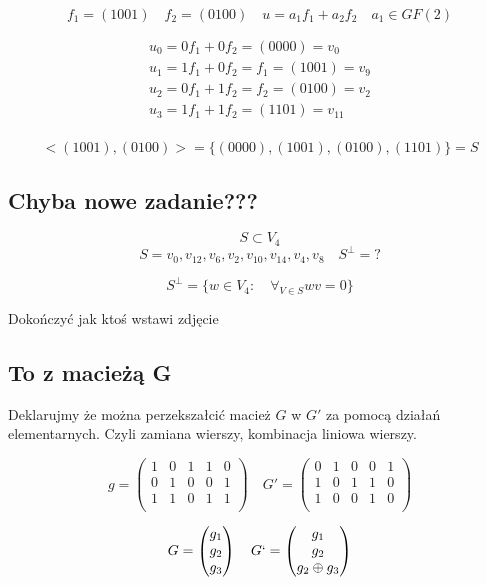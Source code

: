 \documentclass[12pt]{article}
\begin{document}
$$f_1 = (1001) \quad f_2 =(0100) \quad u = a_1f_1+a_2f_2 \quad a_1 \in GF(2) $$

\begin{align*}
    u_0 = 0f_1+0f_2 = (0000) = v_0 \\
    u_1 = 1f_1+0f_2 = f_1  = (1001) = v_9 \\
    u_2 = 0f_1+1f_2 = f_2 = (0100) = v_2 \\
    u_3 = 1f_1+1f_2 = (1101) = v_{11} \\
\end{align*}

$$<(1001),(0100)> = \{(0000), (1001),(0100),(1101)\} = S $$

\subsection*{Chyba nowe zadanie???}

$$S \subset V_4 $$
$$S = {v_0, v_12, v_6, v_2, v_10, v_14, v_4, v_8} \quad S^{\perp} = ?$$

$$S^{\perp} = \{ w \in V_4: \quad \forall_{V \in S} wv=0 \} $$

Dokończyć jak ktoś wstawi zdjęcie

\subsection*{To z macieżą G}

Deklarujmy że można perzekszałcić macież $G$ w $G'$ za pomocą działań elementarnych. 
Czyli zamiana wierszy, kombinacja liniowa wierszy. 

$$
g=
\begin{pmatrix}
    1 & 0 & 1 & 1 & 0 \\
    0 & 1 & 0 & 0 & 1 \\
    1 & 1 & 0 & 1 & 1 \\
\end{pmatrix}
\quad
G'=
\begin{pmatrix}
    0 & 1 & 0 & 0 & 1 \\
    1 & 0 & 1 & 1 & 0 \\
    1 & 0 & 0 & 1 & 0 \\
\end{pmatrix}
 $$

$$G = 
\begin{pmatrix}
    g_1 \\
    g_2 \\
    g_3 \\
\end{pmatrix}
\quad
G` = 
\begin{pmatrix}
    g_1 \\
    g_2 \\
    g_2 \oplus g_3 \\
\end{pmatrix}
$$
\end{document}
